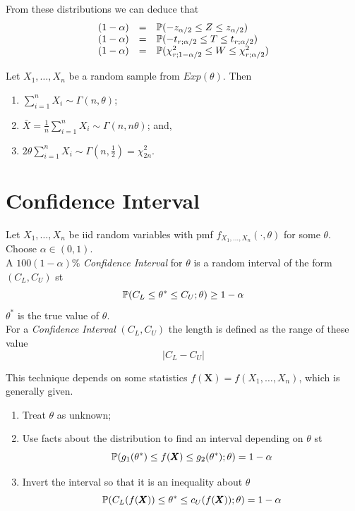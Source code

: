 \documentclass[11pt,a4paper]{article}
\begin{document}
From these distributions we can deduce that
\[\begin{array}{rcl}
(1-\alpha)&=&\mathbb{P}(-z_{\alpha/2}\leq Z\leq z_{\alpha/2})\\
(1-\alpha)&=&\mathbb{P}(-t_{r;\alpha/2}\leq T\leq t_{r;\alpha/2})\\
(1-\alpha)&=&\mathbb{P}(\chi^2_{r;1-\alpha/2}\leq W\leq\chi^2_{r;\alpha/2})
\end{array}\]

\theorem{}
Let $X_1,\dots,X_n$ be a random sample from $Exp(\theta)$. Then
\begin{enumerate}[label=\roman*)]
	\item $\sum_{i=1}^n X_i\sim\Gamma(n,\theta)$;
	\item $\bar{X}=\frac{1}{n}\sum_{i=1}^nX_i\sim\Gamma(n,n\theta)$; and,
	\item $2\theta\sum_{i=1}^nX_i\sim\Gamma(n,\frac{1}{2})=\chi^2_{2n}$.
\end{enumerate}

\section{Confidence Interval}

Let $X_1,\dots,X_n$ be iid random variables with pmf $f_{X_1,\dots,X_n}(\cdot,\theta)$ for some $\theta$.\\
Choose $\alpha\in(0,1)$.\\
A $100(1-\alpha)\%$ \textit{Confidence Interval} for $\theta$ is a random interval of the form $(C_L,C_U)$ st
$$\mathbb{P}(C_L\leq\theta^*\leq C_U;\theta)\geq1-\alpha$$
\nb $\theta^*$ is the true value of $\theta$.\\

For a \textit{Confidence Interval} $(C_L,C_U)$ the length is defined as the range of these value
$$|C_L-C_U|$$

This technique depends on some statistics $f(\pmb{X})=f(X_1,\dots,X_n)$, which is generally given.
\begin{enumerate}[label=\roman*)]
	\item Treat $\theta$ as unknown;
	\item Use facts about the distribution to find an interval depending on $\theta$ st
	$$\mathbb{P}(g_1(\theta^*)\leq f(\pmb{X})\leq g_2(\theta^*);\theta)=1-\alpha$$
	\item Invert the interval so that it is an inequality about $\theta$
	$$\mathbb{P}(C_L(f(\pmb{X}))\leq\theta^*\leq c_U(f(\pmb{X}));\theta)=1-\alpha$$
\end{enumerate}
\end{document}
